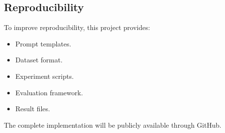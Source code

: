 \subsection{Reproducibility}


To improve reproducibility, this project provides:


\begin{itemize}

\item Prompt templates.

\item Dataset format.

\item Experiment scripts.

\item Evaluation framework.

\item Result files.

\end{itemize}


The complete implementation will be publicly available through GitHub.
